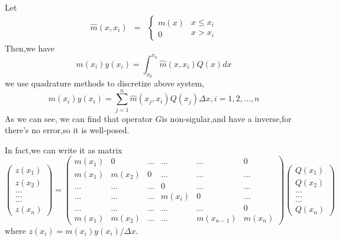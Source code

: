 \documentclass[a4paper]{article}
\begin{document}
Let
\begin{eqnarray}
  \hat{m} \left( x, x_i \right) & = & \left\{ \begin{array}{l}
    m \left( x \right) \\
    0
  \end{array} \right. \begin{array}{c}
    x \leqslant x_i\\
    x > x_i
  \end{array}
\end{eqnarray}
Then,we have
\begin{equation}
  m \left( x_i \right) y \left( x_i \right) = \int_{x_0}^{x_n} \hat{m} \left(
  x, x_i \right) Q \left( x \right) d x
\end{equation}
we use quadrature methods to discretize above system,
\begin{equation}
  m \left( x_i \right) y \left( x_i \right) = \sum^n_{j = 1} \hat{m} \left(
  x_j, x_i \right) Q \left( x_j \right) \Delta x, i = 1, 2, \ldots, n
\end{equation}
As we can see, we can find that operator $G$is non-sigular,and have a
inverse,for there's no error,so it is well-posed.

In fact,we can write it as matrix
\begin{equation}
  \left(\begin{array}{c}
    z \left( x_1 \right)\\
    z \left( x_2 \right)\\
    \ldots\\
    \ldots\\
    \ldots\\
    z \left( x_n \right)
  \end{array}\right) = \left(\begin{array}{lccccc}
    m \left( x_1 \right)  & 0 & \ldots & \ldots & \ldots & 0\\
    m \left( x_1 \right)  & m \left( x_2 \right) & 0 & \ldots & \ldots &
    \ldots\\
    \ldots & \ldots & \ldots & 0 & \ldots & \ldots\\
    \ldots & \ldots & \ldots & m \left( x_i \right) & 0 & \ldots\\
    \ldots & \ldots & \ldots & \ldots & \ldots & 0\\
    m \left( x_1 \right) & m \left( x_2 \right) & \ldots & \ldots & m \left(
    x_{n - 1} \right) & m \left( x_n \right)
  \end{array}\right) \left(\begin{array}{c}
    Q \left( x_1 \right)\\
    Q \left( x_2 \right)\\
    \ldots\\
    \ldots\\
    \ldots\\
    Q \left( x_n \right)
  \end{array}\right)
\end{equation}
where $z \left( x_i \right) = m \left( x_i \right) y \left( x_i \right) /
\Delta x$.
\end{document}
